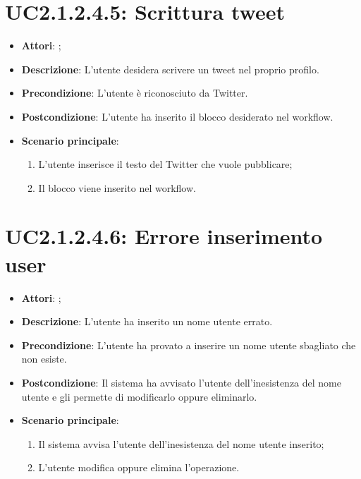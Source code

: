 \section{UC2.1.2.4.5: Scrittura tweet}
\label{UC2.1.2.4.5}
\begin{itemize}
	\item \textbf{Attori}: ;
	\item \textbf{Descrizione}: L'utente desidera scrivere un tweet nel proprio profilo.
	\item \textbf{Precondizione}: L'utente è riconosciuto da Twitter.
	\item \textbf{Postcondizione}: L'utente ha inserito il blocco desiderato nel workflow.
	\item \textbf{Scenario principale}:
	\begin{enumerate} \item L'utente inserisce il testo del Twitter che vuole pubblicare;  \item  Il blocco viene inserito nel workflow.\end{enumerate}
\end{itemize}

\section{UC2.1.2.4.6: Errore inserimento user}
\label{UC2.1.2.4.6}
\begin{itemize}
	\item \textbf{Attori}: ;
	\item \textbf{Descrizione}: L'utente ha inserito un nome utente errato.
	\item \textbf{Precondizione}: L'utente ha provato a inserire un nome utente sbagliato che non esiste.
	\item \textbf{Postcondizione}: Il sistema ha avvisato l'utente dell'inesistenza del nome utente e gli permette di modificarlo oppure eliminarlo.
	\item \textbf{Scenario principale}:
	\begin{enumerate} \item Il sistema avvisa l'utente dell'inesistenza del nome utente inserito;  \item  L'utente modifica oppure elimina l'operazione.\end{enumerate}
\end{itemize}


